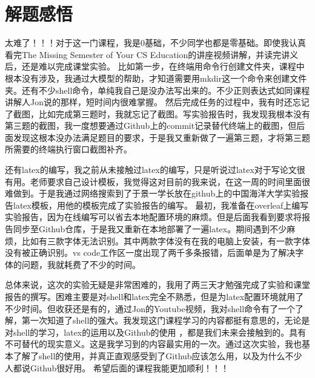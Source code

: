 \chapter{解题感悟}
\label{cp:notes}





太难了！！！对于这一门课程，我是0基础，不少同学也都是零基础。即使我认真看完The Missing Semester of Your CS Education的讲座视频讲解，并读完讲义后，还是难以完成课堂实验。
比如第一步，在终端用命令行创建文件夹，课程中根本没有涉及，我通过大模型的帮助，才知道需要用mkdir这一个命令来创建文件夹。还有不少shell命令，单纯我自己是没办法写出来的。不少正则表达式如同课程讲解人Jon说的那样，短时间内很难掌握。
然后完成任务的过程中，我有时还忘记了截图，比如完成第三题时，我就忘记了截图。写实验报告时，我发现我根本没有第三题的截图，我一度想要通过Github上的commit记录替代终端上的截图，但后面发现这根本没办法满足题目的要求，于是我又重新做了一遍第三题，才将第三题所需要的终端执行窗口截图补齐。

还有latex的编写，我之前从未接触过latex的编写，只是听说过latex对于写论文很有用。老师要求自己设计模板，我觉得这对目前的我来说，在这一周的时间里面很难做到。于是我通过网络搜索到了于景一学长放在github上的中国海洋大学实验报告latex模板，用他的模板完成了实验报告的编写。
最初，我准备在overleaf上编写实验报告，因为在线编写可以省去本地配置环境的麻烦。但是后面我看到要求将报告同步至Github仓库，于是我又重新在本地部署了一遍latex。期间遇到不少麻烦，比如有三款字体无法识别。其中两款字体没有在我的电脑上安装，有一款字体没有被正确识别。vs code工作区一度出现了两千多条报错，后面单是为了解决字体的问题，我就耗费了不少的时间。

总体来说，这次的实验无疑是非常困难的，我用了两三天才勉强完成了实验和课堂报告的撰写。困难主要是对shell和latex完全不熟悉，但是为latex配置环境就用了不少时间。但收获还是有的，通过Jon的Youtube视频，我对shell命令有了一个了解，第一次知道了shell的强大。我发现这门课程学习的内容都挺有意思的，无论是对shell的学习，latex的运用以及Github的使用
，都是我们未来会接触到的。具有不可替代的现实意义。这是我学习到的内容最实用的一次。通过这次实验，我也基本了解了shell的使用，并真正直观感受到了Github应该怎么用，以及为什么不少人都说Github很好用。
希望后面的课程我能更加顺利！！！